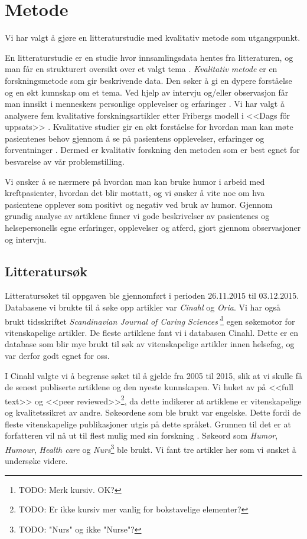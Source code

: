 \chapter{Metode}

Vi har valgt å gjøre en litteraturstudie med kvalitativ metode som
utgangspunkt.

En litteraturstudie er en studie hvor innsamlingsdata hentes fra litteraturen,
og man får en strukturert oversikt over et valgt tema \cite{segesten2006}.
\textit{Kvalitativ metode} er en forskningsmetode som gir beskrivende data. Den
søker å gi en dypere forståelse og en økt kunnskap om et tema. Ved hjelp av
intervju og/eller observasjon får man innsikt i menneskers personlige
opplevelser og erfaringer \cite{olsson2003}. Vi har valgt å analysere fem
kvalitative forskningsartikler etter Fribergs modell i <<Dags för uppsats>>
\citeyear{friberg2006}. Kvalitative studier gir en økt forståelse for hvordan
man kan møte pasientenes behov gjennom å se på pasientens opplevelser,
erfaringer og forventninger \cite{segesten2006}. Dermed er kvalitativ forskning
den metoden som er best egnet for besvarelse av vår problemstilling.

Vi ønsker å se nærmere på hvordan man kan bruke humor i arbeid med
kreftpasienter, hvordan det blir mottatt, og vi ønsker å vite noe om hva
pasientene opplever som positivt og negativ ved bruk av humor. Gjennom grundig
analyse av artiklene finner vi gode beskrivelser av pasientenes og
helsepersonells egne erfaringer, opplevelser og atferd, gjort gjennom
observasjoner og intervju.

\section{Litteratursøk}

Litteratursøket til oppgaven ble gjennomført i perioden 26.11.2015 til
03.12.2015. Databasene vi brukte til å søke opp artikler var \textit{Cinahl} og
\textit{Oria}. Vi har også brukt tidsskriftet \textit{Scandinavian Journal of
Caring Sciences'}\footnote{TODO: Merk kursiv. OK?} egen søkemotor for
vitenskapelige artikler. De fleste artiklene fant vi i databasen Cinahl. Dette
er en database som blir mye brukt til søk av vitenskapelige artikler innen
helsefag, og var derfor godt egnet for oss.

I Cinahl valgte vi å begrense søket til å gjelde fra 2005 til 2015, slik at vi
skulle få de senest publiserte artiklene og den nyeste kunnskapen. Vi huket av
på <<full text>> og <<peer reviewed>>\footnote{TODO: Er ikke kursiv mer vanlig
for bokstavelige elementer?}, da dette indikerer at artiklene er vitenskapelige
og kvalitetssikret av andre. Søkeordene som ble brukt var engelske. Dette fordi
de fleste vitenskapelige publikasjoner utgis på dette språket. Grunnen til det
er at forfatteren vil nå ut til flest mulig med sin forskning
\cite{friberg2006}. Søkeord som \textit{Humor}, \textit{Humour}, \textit{Health
care} og \textit{Nurs}\footnote{TODO: "Nurs" og ikke "Nurse"?} ble brukt. Vi
fant tre artikler her som vi ønsket å undersøke videre.

